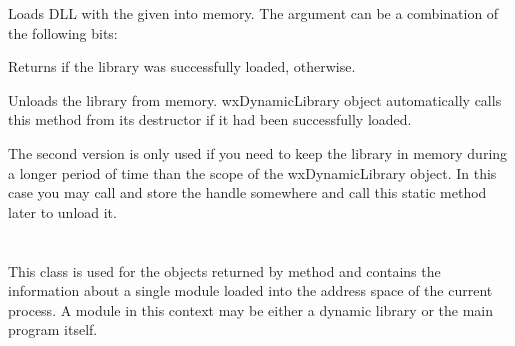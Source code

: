 \label{wxdynamiclibraryload}


Loads DLL with the given  into memory. The  argument can
be a combination of the following bits:

\begin{twocollist}
\end{twocollist}

Returns \true if the library was successfully loaded, \false otherwise.


\label{wxdynamiclibraryunload}



Unloads the library from memory. wxDynamicLibrary object automatically calls
this method from its destructor if it had been successfully loaded.

The second version is only used if you need to keep the library in memory
during a longer period of time than the scope of the wxDynamicLibrary object.
In this case you may call  and store
the handle somewhere and call this static method later to unload it.


\section{}\label{wxdynamiclibrarydetails}

This class is used for the objects returned by 
 method and
contains the information about a single module loaded into the address space of
the current process. A module in this context may be either a dynamic library
or the main program itself.

